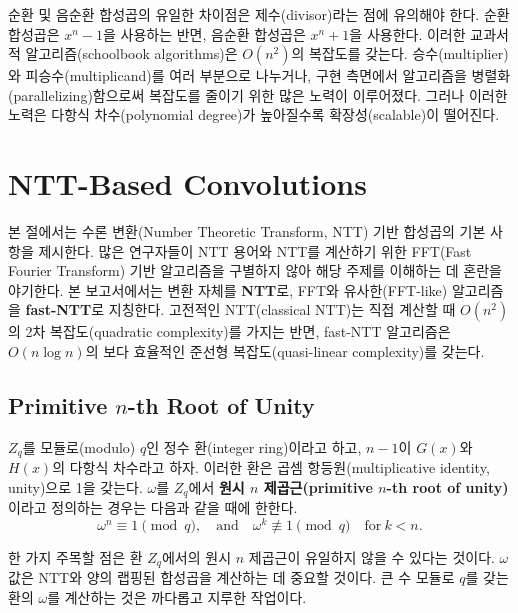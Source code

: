 순환 및 음순환 합성곱의 유일한 차이점은 제수(divisor)라는 점에 유의해야 한다. 순환 합성곱은 $x^n - 1$을 사용하는 반면, 음순환 합성곱은 $x^n + 1$을 사용한다. 이러한 교과서적 알고리즘(schoolbook algorithms)은 $O(n^2)$의 복잡도를 갖는다. 승수(multiplier)와 피승수(multiplicand)를 여러 부분으로 나누거나, 구현 측면에서 알고리즘을 병렬화(parallelizing)함으로써 복잡도를 줄이기 위한 많은 노력이 이루어졌다. 그러나 이러한 노력은 다항식 차수(polynomial degree)가 높아질수록 확장성(scalable)이 떨어진다.

\section{NTT-Based Convolutions}

본 절에서는 수론 변환(Number Theoretic Transform, NTT) 기반 합성곱의 기본 사항을 제시한다. 많은 연구자들이 NTT 용어와 NTT를 계산하기 위한 FFT(Fast Fourier Transform) 기반 알고리즘을 구별하지 않아 해당 주제를 이해하는 데 혼란을 야기한다. 본 보고서에서는 변환 자체를 \textbf{NTT}로, FFT와 유사한(FFT-like) 알고리즘을 \textbf{fast-NTT}로 지칭한다. 고전적인 NTT(classical NTT)는 직접 계산할 때 $O(n^2)$의 2차 복잡도(quadratic complexity)를 가지는 반면, fast-NTT 알고리즘은 $O(n \log n)$의 보다 효율적인 준선형 복잡도(quasi-linear complexity)를 갖는다.

\subsection{Primitive $n$-th Root of Unity}

\begin{tcolorbox}[colback=white, boxrule=0.7pt, sharp corners]
\begin{definition}
$Z_q$를 모듈로(modulo) $q$인 정수 환(integer ring)이라고 하고, $n-1$이 $G(x)$와 $H(x)$의 다항식 차수라고 하자. 이러한 환은 곱셈 항등원(multiplicative identity, unity)으로 1을 갖는다. $\omega$를 $Z_q$에서 \textbf{원시 $n$ 제곱근(primitive $n$-th root of unity)}이라고 정의하는 경우는 다음과 같을 때에 한한다.
\begin{equation}
    \omega^n \equiv 1 \pmod q, \quad \text{and} \quad \omega^k \not\equiv 1 \pmod q \quad \text{for} \ k < n.
\end{equation}
\end{definition}
\end{tcolorbox}

한 가지 주목할 점은 환 $Z_q$에서의 원시 $n$ 제곱근이 유일하지 않을 수 있다는 것이다. $\omega$ 값은 NTT와 양의 랩핑된 합성곱을 계산하는 데 중요할 것이다. 큰 수 모듈로 $q$를 갖는 환의 $\omega$를 계산하는 것은 까다롭고 지루한 작업이다.

